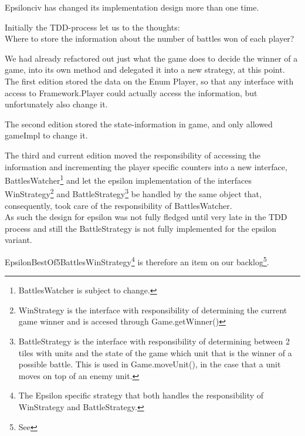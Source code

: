 Epsilonciv has changed its implementation design more than one time. 

Initially the TDD-process let us to the thoughts: \\
Where to store the information about the number of battles won of each player?

We had already refactored out just what the game does to decide the winner of a game, into its own method and delegated it into a new strategy, at this point.\\

The first edition stored the data on the Enum Player, so that any interface with access to Framework.Player could actually access the information, but unfortunately also change it.

The second edition stored the state-information in game, and only allowed gameImpl to change it.

The third and current edition moved the responsibility of accessing the information and incrementing the player specific counters into a new interface, BattlesWatcher\footnote{BattlesWatcher is subject to change.} 
and let the epsilon implementation of the interfaces WinStrategy\footnote{WinStrategy is the interface with responsibility of determining the current game winner and is accesed through Game.getWinner()}
 and BattleStrategy\footnote{BattleStrategy is the interface with responsibility of determining between 2 tiles with units and the state of the game which unit that is the winner of a possible battle. This is used in Game.moveUnit(), in the case that a unit moves on top of an enemy unit.}
 be handled by the same object that, consequently, took care of the responsibility of BattlesWatcher.
\\

As such the design for epsilon was not fully fledged until very late in the TDD process and still the BattleStrategy is not fully implemented for the epsilon variant.

EpsilonBestOf5BattlesWinStrategy\footnote{The Epsilon specific strategy that both handles the responsibility of WinStrategy and BattleStrategy.} is therefore an item on our backlog\footnote{See }.
